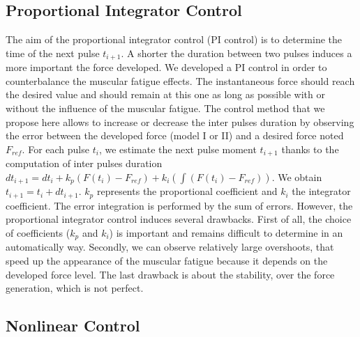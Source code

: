\documentclass[10pt,twocolumn,letterpaper, 
]{article}
\begin{document}
\subsection{Proportional Integrator Control}

The aim of the proportional integrator control (PI control) is to determine the time of the next pulse $t_{i+1}$. A shorter the duration between two pulses induces a more important the force developed. We developed a PI control in order to counterbalance the muscular fatigue effects. The instantaneous force should reach the desired value and should remain at this one as long as possible with or without the influence of the muscular fatigue. The control method that we propose here allows to increase or decrease the inter pulses duration by observing the error between the developed force (model I or II) and a desired force noted $F_{ref}$. For each pulse $t_i$, we estimate the next pulse moment $t_{i+1}$ thanks to the computation of inter pulses duration \textit{$dt_{i+1}= dt_i + k_p(F(t_i)-F_{ref}) +k_i(\int (F(t_i)-F_{ref}))$}. We obtain \textit{$t_{i+1}=t_i+dt_{i+1}$}. $k_p$ represents the proportional coefficient and $k_i$ the integrator coefficient. The error integration is performed by the sum of errors. However, the proportional integrator control induces several drawbacks. First of all, the choice of coefficients ($k_p$ and $k_i$) is important and remains difficult to determine in an automatically way. Secondly, we can observe relatively large overshoots, that speed up the appearance of the muscular fatigue because it depends on the developed force level. The last drawback is about the stability, over the force generation, which is not perfect.
	
\subsection{Nonlinear Control}
\end{document}
